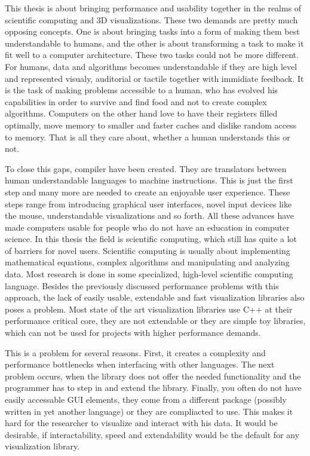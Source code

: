 
This thesis is about bringing performance and usability together in the realms of scientific computing and 3D visualizations.
These two demands are pretty much opposing concepts. One is about bringing tasks into a form of making them best understandable to humans, and the other is about transforming a task to make it fit well to a computer architecture.
These two tasks could not be more different. For humans, data and algorithms becomes understandable if they are high level and represented visualy, auditorial or tactile together with immidiate feedback. 
It is the task of making problems accessible to a human, who has evolved his capabilities in order to survive and find food and not to create complex algorithms.
Computers on the other hand love to have their registers filled optimally, move memory to smaller and faster caches and dislike random access to memory. That is all they care about, whether a human understands this or not.

To close this gaps, compiler have been created. They are translators between human understandable languages to machine instructions.
This is just the first step and many more are needed to create an enjoyable user experience.
These steps range from introducing graphical user interfaces, novel input devices like the mouse, understandable visualizations and so forth.
All these advances have made computers usable for people who do not have an education in computer science.
In this thesis the field is scientific computing, which still has quite a lot of barriers for novel users.
Scientific computing is usually about implementing mathematical equations, complex algorithms and manipulating and analyzing data.
Most research is done in some specialized, high-level scientific computing language.
Besides the previously discussed performance problems with this approach, the lack of easily usable, extendable and fast visualization libraries also poses a problem.
Most state of the art visualization libraries use C++ at their performance critical core, they are not extendable or they are simple toy libraries, which can not be used for projects with higher performance demands.

This is a problem for several reasons.
First, it creates a complexity and performance bottlenecks when interfacing with other languages. The next problem occurs, when the library does not offer the needed functionality and the programmer has to step in and extend the library.
Finally, you often do not have easily accessable GUI elements, they come from a different package (possibly written in yet another language) or they are compliacted to use. 
This makes it hard for the researcher to visualize and interact with his data. It would be desirable, if interactability, speed and extendability would be the default for any visualization library.


